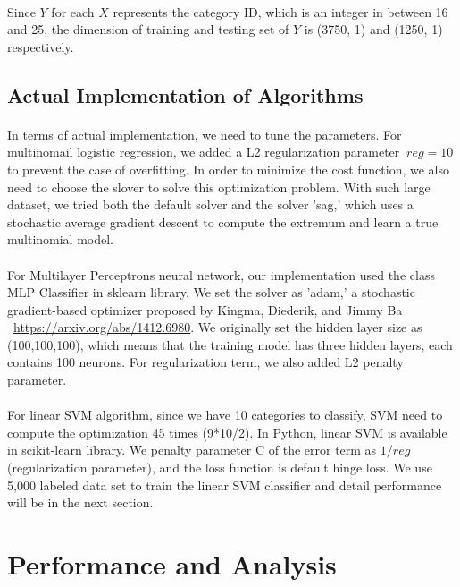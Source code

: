 \documentclass{article}
\begin{document}
\paragraph{}
Since $Y$ for each $X$ represents the category ID, which is an integer in between 16 and 25, the dimension of training and testing set of $Y$ is (3750, 1) and  (1250, 1) respectively.
 

\subsection{Actual Implementation of Algorithms}
\paragraph{}
In terms of actual implementation, we need to tune the parameters. For multinomail logistic regression, we added a L2 regularization parameter $ \ reg=10\ $ to prevent the case of overfitting. In order to minimize the cost function, we also need to choose the slover to solve this optimization problem. With such large dataset, we tried both the default solver and the solver 'sag,' which uses a stochastic average gradient descent to compute the extremum and learn a true multinomial model. 
\paragraph{}
 For Multilayer Perceptrons neural network, our implementation used the class MLP Classifier in sklearn library. We set the solver as 'adam,' a stochastic gradient-based optimizer proposed by Kingma, Diederik, and Jimmy Ba \  \url{https://arxiv.org/abs/1412.6980}. We originally set the hidden layer size as (100,100,100), which means that the training model has three hidden layers, each contains 100 neurons. For regularization term, we also added L2 penalty  parameter.
\paragraph{}
For linear SVM algorithm, since we have 10 categories to classify, SVM need to compute the optimization 45 times (9*10/2). In Python, linear SVM is  available in scikit-learn library. We penalty parameter C of the error term as $1\slash reg$ (regularization parameter), and the loss function is default hinge loss. We use 5,000 labeled data set to train the linear SVM classifier and detail performance will be in the next section.
 

\section{Performance and Analysis}
\end{document}
